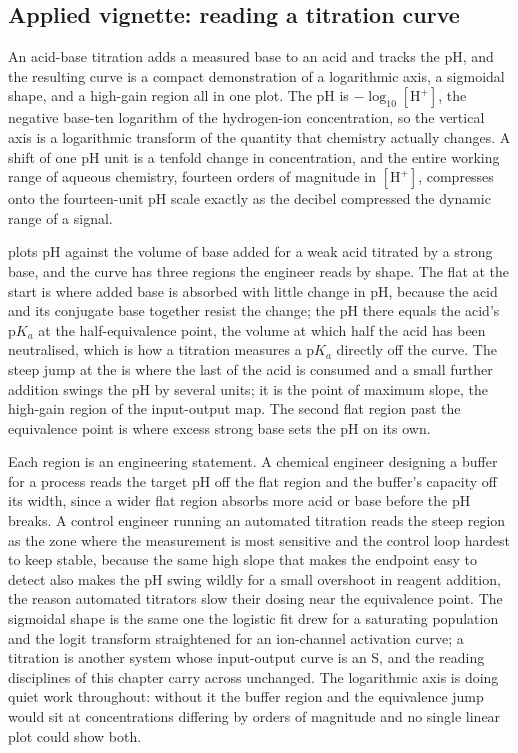 

\subsection{Applied vignette: reading a titration curve}

An acid-base titration adds a measured base to an acid and tracks the
pH, and the resulting curve is a compact demonstration of a logarithmic
axis, a sigmoidal shape, and a high-gain region all in one plot. The pH
is $-\log_{10}[\mathrm{H}^{+}]$, the negative base-ten logarithm of the
hydrogen-ion concentration, so the vertical axis is a logarithmic
transform of the quantity that chemistry actually changes. A shift of
one pH unit is a tenfold change in concentration, and the entire
working range of aqueous chemistry, fourteen orders of magnitude in
$[\mathrm{H}^{+}]$, compresses onto the fourteen-unit pH scale exactly
as the decibel compressed the dynamic range of a signal.

 plots pH against the volume of
base added for a weak acid titrated by a strong base, and the curve has
three regions the engineer reads by shape. The flat  at the start is where added base is absorbed with little change
in pH, because the acid and its conjugate base together resist the
change; the pH there equals the acid's $\mathrm{p}K_a$ at the
half-equivalence point, the volume at which half the acid has been
neutralised, which is how a titration measures a $\mathrm{p}K_a$
directly off the curve. The steep jump at the  is where the last of the acid is consumed and a small further
addition swings the pH by several units; it is the point of maximum
slope, the high-gain region of the input-output map. The second flat
region past the equivalence point is where excess strong base sets the
pH on its own.

Each region is an engineering statement. A chemical engineer designing
a buffer for a process reads the target pH off the flat region and the
buffer's capacity off its width, since a wider flat region absorbs more
acid or base before the pH breaks. A control engineer running an
automated titration reads the steep region as the zone where the
measurement is most sensitive and the control loop hardest to keep
stable, because the same high slope that makes the endpoint easy to
detect also makes the pH swing wildly for a small overshoot in
reagent addition, the reason automated titrators slow their dosing
near the equivalence point. The sigmoidal shape is the same one the
logistic fit drew for a saturating population and the logit transform
straightened for an ion-channel activation curve; a titration is
another system whose input-output curve is an S, and the reading
disciplines of this chapter carry across unchanged. The logarithmic
axis is doing quiet work throughout: without it the buffer region and
the equivalence jump would sit at concentrations differing by orders
of magnitude and no single linear plot could show both.

